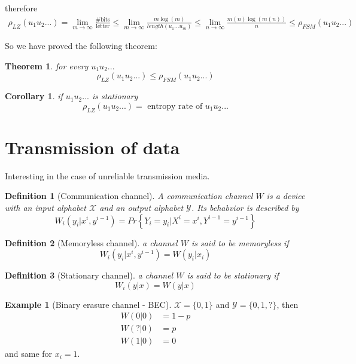 \documentclass{article}
\newtheorem{theorem}{Theorem}[section]
\newtheorem{corollary}{Corollary}[theorem]
\newtheorem{definition}{Definition}[section]
\theoremstyle{definition} %
\newtheorem{example}{Example}
\renewcommand{\Pr}[1]{Pr\left\{#1\right\}}
\def\X{\mathcal{X}}
\def\Y{\mathcal{Y}}
\begin{document}
therefore
\begin{align*}
  \rho_{LZ}(u_1 u_2 ...) = \lim_{m \to \infty} \frac{\text{\# bits}}{\text{letter}} \leq \lim_{m \to \infty} \frac{m \log(m)}{length(u_1 ... u_m)} \leq \lim_{n \to \infty} \frac{m(n) \log(m(n))}{n} \leq \rho_{FSM}(u_1 u_2 ...)
\end{align*}

So we have proved the following theorem:

\begin{theorem}
  for every $u_1 u_2 ...$
  $$ \rho_{LZ}(u_1 u_2 ...) \leq \rho_{FSM}(u_1 u_2 ...) $$
\end{theorem}

\begin{corollary}
  if $u_1 u_2 ...$ is stationary
  $$ \rho_{LZ}(u_1 u_2 ...) = \text{ entropy rate of } u_1 u_2 ...$$
\end{corollary}



\section{Transmission of data}

Interesting in the case of unreliable transmission media.

\begin{definition}[Communication channel]
  A communication channel $W$ is a device with an input alphabet $\X$ and an output
  alphabet $\Y$. Its behabvior is described by
  \[
    W_i(y_i | x^i, y^{i-1}) = \Pr{Y_i = y_i | X^i = x^i, Y^{i-1} = y^{i-1}}
  \]
\end{definition}

\begin{definition}[Memoryless channel]
  a channel $W$ is said to be memoryless if
  \[
      W_i(y_i | x^i, y^{i-1}) = W(y_i|x_i)
    \]
\end{definition}

\begin{definition}[Stationary channel]
  a channel $W$ is said to be stationary if
  \[
      W_i(y|x) = W(y|x)
    \]
\end{definition}

\begin{example}[Binary erasure channel - BEC]
  $\X = \{0,1\}$ and $\Y = \{0,1,?\}$, then
  \begin{align*}
    W(0|0) &= 1 - p\\
    W(?|0) &= p\\
    W(1|0) &= 0
  \end{align*}
  and same for $x_i=1$.
\end{example}
\end{document}
